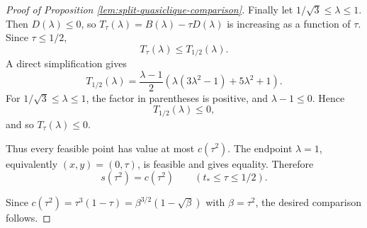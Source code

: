 \documentclass[10pt,a4paper]{amsart}
\begin{document}
\begin{proof}[Proof of Proposition \ref{lem:split-quasiclique-comparison}]
Finally let \(1/\sqrt{3}\le\lambda\le1\). Then \(D(\lambda)\le0\), so
\(T_\tau(\lambda)=B(\lambda)-\tau D(\lambda)\) is increasing as a function of
\(\tau\). Since \(\tau\le1/2\),
\[
T_\tau(\lambda)\le T_{1/2}(\lambda).
\]
A direct simplification gives
\[
T_{1/2}(\lambda)
=
\frac{\lambda-1}{2}
\left(\lambda(3\lambda^2-1)+5\lambda^2+1\right).
\]
For \(1/\sqrt{3}\le\lambda\le1\), the factor in parentheses is positive, and
\(\lambda-1\le0\). Hence
\[
T_{1/2}(\lambda)\le0,
\]
and so \(T_\tau(\lambda)\le0\).


Thus every feasible point has value at most \(c(\tau^2)\). The endpoint
\(\lambda=1\), equivalently \((x,y)=(0,\tau)\), is feasible and gives
equality. Therefore
\[
s(\tau^2)=c(\tau^2)
\qquad
(t_*\le\tau\le1/2).
\]


Since \(c(\tau^2)=\tau^3(1-\tau)=\beta^{3/2}(1-\sqrt{\beta})\) with
\(\beta=\tau^2\), the desired comparison follows.
\end{proof}
\end{document}
